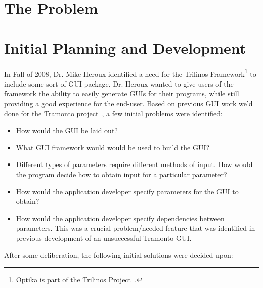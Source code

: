 \section{The Problem}

\section{Initial Planning and Development}
In Fall of 2008, Dr. Mike Heroux identified a need for
the Trilinos Framework\footnote{Optika is part of the Trilinos Project~\cite{1089021}.} to include some sort of GUI package. Dr. Heroux wanted 
to give users of the framework the ability to easily generate GUIs for their
programs, while still providing a good experience for the end-user. Based on
previous GUI work we'd done for the Tramonto project~\cite{Tramonto}, a few initial problems were
identified:

	\begin{itemize}
		\item How would the GUI be laid out?
		\item What GUI framework would would be used to build the GUI?
		\item Different types of parameters require different methods of input.
			How would the program decide how to obtain input for a particular
			parameter?
		\item How would the application developer specify parameters for the
			GUI to obtain?
		\item How would the application developer specify dependencies between
		parameters. This was a crucial problem/needed-feature that was identified in
		previous development of an unsuccessful Tramonto GUI.
	\end{itemize}

After some deliberation, the following initial solutions were decided upon:

